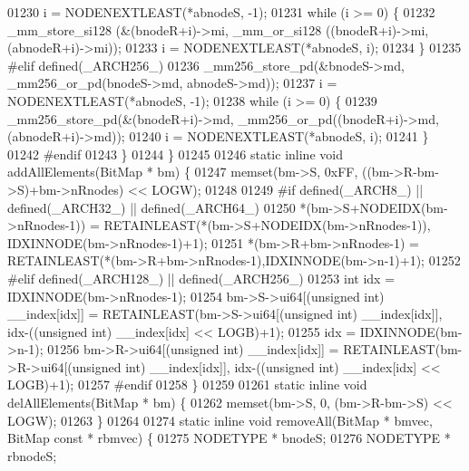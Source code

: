 \begin{DoxyCode}
{01230                 i = NODENEXTLEAST(*abnodeS, -1);
01231                 \textcolor{keywordflow}{while} (i >= 0) \{
01232                         \_mm\_store\_si128 (&(bnodeR+i)->mi, \_mm\_or\_si128 ((bnodeR+i)->mi, (abnodeR+i)->mi));
01233                         i = NODENEXTLEAST(*abnodeS, i);
01234                 \}
01235 \textcolor{preprocessor}{#elif defined(\_ARCH256\_)}
01236                 \_mm256\_store\_pd(&bnodeS->md, \_mm256\_or\_pd(bnodeS->md, abnodeS->md));
01237                 i = NODENEXTLEAST(*abnodeS, -1);
01238                 \textcolor{keywordflow}{while} (i >= 0) \{
01239                         \_mm256\_store\_pd(&(bnodeR+i)->md, \_mm256\_or\_pd((bnodeR+i)->md, (abnodeR+i)->md));
01240                         i = NODENEXTLEAST(*abnodeS, i);
01241                 \}
01242 \textcolor{preprocessor}{#endif}
01243         \}
01244 \}
01245 
01246 \textcolor{keyword}{static} \textcolor{keyword}{inline} \textcolor{keywordtype}{void} addAllElements(BitMap * bm) \{
01247         memset(bm->S, 0xFF, ((bm->R-bm->S)+bm->nRnodes) << LOGW);
01248 
01249 \textcolor{preprocessor}{#if defined(\_ARCH8\_) || defined(\_ARCH32\_) || defined(\_ARCH64\_)}
01250         *(bm->S+NODEIDX(bm->nRnodes-1)) = RETAINLEAST(*(bm->S+NODEIDX(bm->nRnodes-1)),
      IDXINNODE(bm->nRnodes-1)+1);
01251         *(bm->R+bm->nRnodes-1) = RETAINLEAST(*(bm->R+bm->nRnodes-1),IDXINNODE(bm->n-1)+1);
01252 \textcolor{preprocessor}{#elif defined(\_ARCH128\_) || defined(\_ARCH256\_)}
01253         \textcolor{keywordtype}{int} idx = IDXINNODE(bm->nRnodes-1);
01254         bm->S->ui64[(\textcolor{keywordtype}{unsigned} int) \_\_index[idx]] = RETAINLEAST(bm->S->ui64[(\textcolor{keywordtype}{unsigned} \textcolor{keywordtype}{int}) \_\_index[idx]], 
      idx-((\textcolor{keywordtype}{unsigned} int) \_\_index[idx] << LOGB)+1);
01255         idx = IDXINNODE(bm->n-1);
01256         bm->R->ui64[(\textcolor{keywordtype}{unsigned} int) \_\_index[idx]] = RETAINLEAST(bm->R->ui64[(\textcolor{keywordtype}{unsigned} \textcolor{keywordtype}{int}) \_\_index[idx]], 
      idx-((\textcolor{keywordtype}{unsigned} int) \_\_index[idx] << LOGB)+1);
01257 \textcolor{preprocessor}{#endif}
01258 \}
01259 
01261 \textcolor{keyword}{static} \textcolor{keyword}{inline} \textcolor{keywordtype}{void} delAllElements(BitMap * bm) \{
01262         memset(bm->S, 0, (bm->R-bm->S) << LOGW);
01263 \}
01264 
01274 \textcolor{keyword}{static} \textcolor{keyword}{inline} \textcolor{keywordtype}{void} removeAll(BitMap * bmvec, BitMap \textcolor{keyword}{const} * rbmvec) \{
01275         NODETYPE * bnodeS;
01276         NODETYPE * rbnodeS;
}
\end{DoxyCode}
